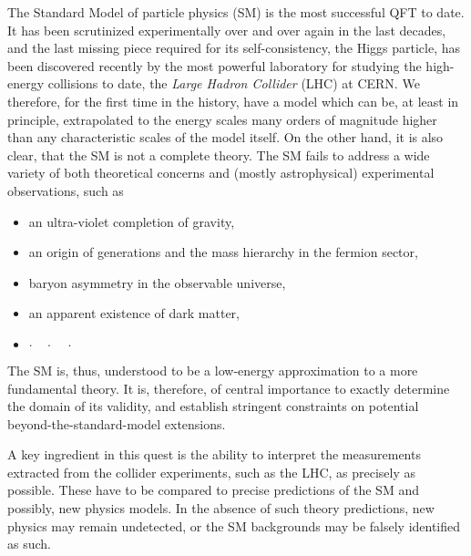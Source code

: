 The Standard Model of particle physics (SM) is the most successful QFT to date.
It has been scrutinized experimentally over and over again in the last decades, and the
last missing piece required for its self-consistency, the Higgs particle, has been discovered recently by the most
powerful laboratory for studying  the high-energy collisions to date, the \emph{Large Hadron Collider} (LHC) at CERN.
We therefore, for the first time in the history, have a model which can be, at least in principle, extrapolated to the energy scales many orders of magnitude higher than
any characteristic scales of the model itself.
On the other hand, it is also clear, that the SM is not a complete theory.
The SM fails to address a wide variety of both theoretical concerns and (mostly astrophysical) experimental observations, such as
\begin{itemize}[nosep,topsep=-1.6ex]
  \item an ultra-violet completion of gravity,
  \item an origin of generations and the mass hierarchy in the fermion sector,
  \item baryon asymmetry in the observable universe, 
  \item an apparent existence of dark matter,
  \item[]  $\cdot\quad\cdot\quad\cdot$ %
\end{itemize}
The SM is, thus, understood to be a low-energy approximation to a more fundamental theory.
It is, therefore, of central importance to exactly determine the domain of its validity,
and establish stringent constraints on potential beyond-the-standard-model extensions.

A key ingredient in this quest is the ability to interpret the measurements extracted from the collider experiments, such as the LHC, as precisely as possible.
These have to be compared to precise predictions of the SM and possibly, new physics models.
In the absence of such theory predictions, new physics may remain undetected, or the SM backgrounds may be falsely identified as such.


